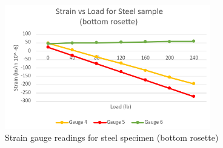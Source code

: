 \documentclass[12pt, titlepage]{article}
\begin{document}
\begin{figure}[H]
    \centering
    \includegraphics[width=0.8\textwidth]{./Images/S_bot.png}
    \captionsetup{justification=raggedright,singlelinecheck=false}
    \caption{Strain gauge readings for steel specimen (bottom rosette)}
    \label{fig:steel_bot}
\end{figure}
\end{document}

